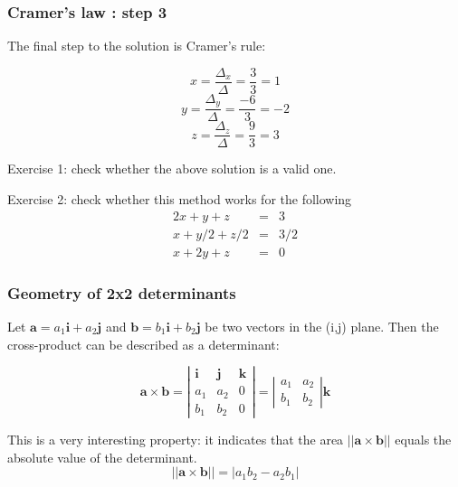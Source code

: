 \documentclass{beamer}
\begin{document}
\begin{frame}
\frametitle{Cramer's law : step 3}
The final step to the solution is Cramer's rule:

$$ x = \frac{\Delta_{x}}{\Delta} = \frac{3}{3} = 1$$
$$ y = \frac{\Delta_{y}}{\Delta} = \frac{-6}{3} = -2$$
$$ z = \frac{\Delta_{z}}{\Delta} = \frac{9}{3} = 3$$

Exercise 1: check whether the above solution is a valid one. \\


\end{frame}
\begin{frame}
Exercise 2: check whether this method works for the following\\

$$
\begin{array}{ccc}
2x + y + z &=& 3\\
x+y/2 + z/2 &=& 3/2\\
x + 2y + z &=& 0
\end{array}$$

\end{frame}


\begin{frame}
\frametitle{Geometry of 2x2 determinants}
Let $\mathbf{a} = a_1 \mathbf{i} + a_2 \mathbf{j}$ and $\mathbf{b} = b_1 \mathbf{i} + b_2 \mathbf{j}$ be two vectors in the (i,j) plane. Then the cross-product can be described as a determinant:

$$\mathbf{a}  \times \mathbf{b} =  
\left| \begin{array}{ccc}
\mathbf{i} & \mathbf{j} & \mathbf{k}\\
a_1 & a_2 & 0\\
b_1 & b_2 & 0
\end{array}
\right| =  
\left| \begin{array}{cc}
a_1 & a_2 \\
b_1 & b_2 
\end{array} \right| \mathbf{k}$$

This is a very interesting property: it indicates that the area  $ || \mathbf{a}  \times \mathbf{b} || $ equals the absolute value of the determinant.
$$ || \mathbf{a}  \times \mathbf{b} ||  = | a_1b_2 - a_2b_1 | $$

%
%
%
\end{frame}
\end{document}
